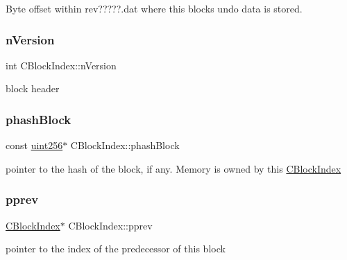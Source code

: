 Byte offset within rev?????.dat where this block\textquotesingle{}s undo data is stored. 

\mbox{\label{class_c_block_index_a45126301a0a6e26010527a7bbfc1ef58}} 
\subsubsection{\texorpdfstring{n\+Version}{nVersion}}
{\footnotesize\ttfamily int C\+Block\+Index\+::n\+Version}



block header 

\mbox{\label{class_c_block_index_afac8099e03ffda463c7153ca82d37b66}} 
\subsubsection{\texorpdfstring{phash\+Block}{phashBlock}}
{\footnotesize\ttfamily const \mbox{\hyperlink{classuint256}{uint256}}$\ast$ C\+Block\+Index\+::phash\+Block}



pointer to the hash of the block, if any. Memory is owned by this \mbox{\hyperlink{class_c_block_index}{C\+Block\+Index}} 

\mbox{\label{class_c_block_index_a1ef11137155df1dd5c81491630cece39}} 
\subsubsection{\texorpdfstring{pprev}{pprev}}
{\footnotesize\ttfamily \mbox{\hyperlink{class_c_block_index}{C\+Block\+Index}}$\ast$ C\+Block\+Index\+::pprev}



pointer to the index of the predecessor of this block 

\mbox{\label{class_c_block_index_ab6242bb77bc01617f5b402d14e6a3883}} 
